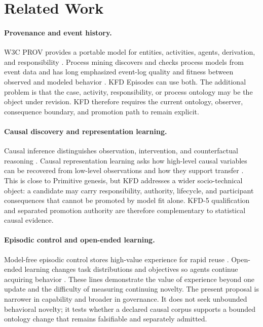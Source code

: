 \section{Related Work}
\label{sec:related}

\paragraph{Provenance and event history.}
W3C PROV provides a portable model for entities, activities, agents,
derivation, and responsibility \cite{w3cProv2013}. Process mining discovers
and checks process models from event data and has long emphasized event-log
quality and fitness between observed and modeled behavior
\cite{vanDerAalst2012manifesto}. KFD Episodes can use both. The additional
problem is that the case, activity, responsibility, or process ontology may be
the object under revision. KFD therefore requires the current ontology,
observer, consequence boundary, and promotion path to remain explicit.

\paragraph{Causal discovery and representation learning.}
Causal inference distinguishes observation, intervention, and counterfactual
reasoning \cite{pearl2009causality}. Causal representation learning asks how
high-level causal variables can be recovered from low-level observations and
how they support transfer \cite{scholkopf2021causal}. This is close to
Primitive genesis, but KFD addresses a wider socio-technical object: a
candidate may carry responsibility, authority, lifecycle, and participant
consequences that cannot be promoted by model fit alone. KFD-5 qualification
and separated promotion authority are therefore complementary to statistical
causal evidence.

\paragraph{Episodic control and open-ended learning.}
Model-free episodic control stores high-value experience for rapid reuse
\cite{blundell2016episodic}. Open-ended learning changes task distributions and
objectives so agents continue acquiring behavior
\cite{stooke2021open,guttenberg2019open}. These lines demonstrate the value of
experience beyond one update and the difficulty of measuring continuing
novelty. The present proposal is narrower in capability and broader in
governance. It does not seek unbounded behavioral novelty; it tests whether a
declared causal corpus supports a bounded ontology change that remains
falsifiable and separately admitted.


